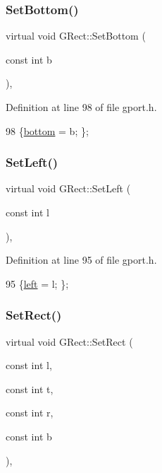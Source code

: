 \subsubsection{\texorpdfstring{Set\+Bottom()}{SetBottom()}}
{\footnotesize\ttfamily virtual void G\+Rect\+::\+Set\+Bottom (\begin{DoxyParamCaption}\item[{const int}]{b }\end{DoxyParamCaption})\hspace{0.3cm}{\ttfamily [inline]}, {\ttfamily [virtual]}}



Definition at line 98 of file gport.\+h.


\begin{DoxyCode}
98 \{\mbox{\hyperlink{class_g_rect_a767f1eb55f7e9880f58609406b2d6a66}{bottom}} = b; \};
\end{DoxyCode}
\mbox{\label{class_g_rect_af8fab889fb03811f8ba166abfe2b9c01}} 
\subsubsection{\texorpdfstring{Set\+Left()}{SetLeft()}}
{\footnotesize\ttfamily virtual void G\+Rect\+::\+Set\+Left (\begin{DoxyParamCaption}\item[{const int}]{l }\end{DoxyParamCaption})\hspace{0.3cm}{\ttfamily [inline]}, {\ttfamily [virtual]}}



Definition at line 95 of file gport.\+h.


\begin{DoxyCode}
95 \{\mbox{\hyperlink{class_g_rect_ab848c49d0c6376f749a592042791b98b}{left}} = l; \};
\end{DoxyCode}
\mbox{\label{class_g_rect_a1fd6fd632b6d3c068382766a0c18340f}} 
\subsubsection{\texorpdfstring{Set\+Rect()}{SetRect()}}
{\footnotesize\ttfamily virtual void G\+Rect\+::\+Set\+Rect (\begin{DoxyParamCaption}\item[{const int}]{l,  }\item[{const int}]{t,  }\item[{const int}]{r,  }\item[{const int}]{b }\end{DoxyParamCaption})\hspace{0.3cm}{\ttfamily [inline]}, {\ttfamily [virtual]}}



